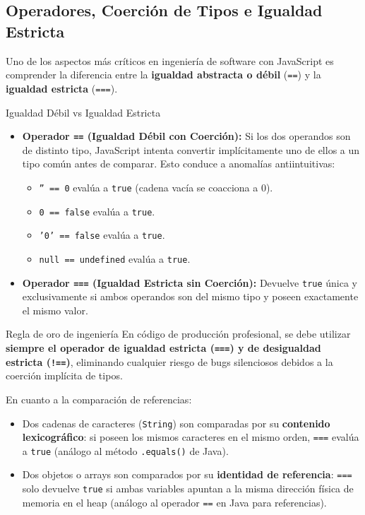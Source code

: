 \subsection{Operadores, Coerción de Tipos e Igualdad Estricta}

Uno de los aspectos más críticos en ingeniería de software con JavaScript es comprender la diferencia entre la \textbf{igualdad abstracta o débil} (\texttt{==}) y la \textbf{igualdad estricta} (\texttt{===}).

\begin{definicion}{Igualdad Débil vs Igualdad Estricta}
\begin{itemize}
    \item \textbf{Operador \texttt{==} (Igualdad Débil con Coerción):} Si los dos operandos son de distinto tipo, JavaScript intenta convertir implícitamente uno de ellos a un tipo común antes de comparar. Esto conduce a anomalías antiintuitivas:
    \begin{itemize}
        \item \texttt{'' == 0} evalúa a \texttt{true} (cadena vacía se coacciona a 0).
        \item \texttt{0 == false} evalúa a \texttt{true}.
        \item \texttt{'0' == false} evalúa a \texttt{true}.
        \item \texttt{null == undefined} evalúa a \texttt{true}.
    \end{itemize}
    \item \textbf{Operador \texttt{===} (Igualdad Estricta sin Coerción):} Devuelve \texttt{true} única y exclusivamente si ambos operandos son del mismo tipo y poseen exactamente el mismo valor.
\end{itemize}
\end{definicion}

\begin{importante}{Regla de oro de ingeniería}
En código de producción profesional, se debe utilizar \textbf{siempre el operador de igualdad estricta (\texttt{===}) y de desigualdad estricta (\texttt{!==})}, eliminando cualquier riesgo de bugs silenciosos debidos a la coerción implícita de tipos.
\end{importante}

En cuanto a la comparación de referencias:
\begin{itemize}
    \item Dos cadenas de caracteres (\texttt{String}) son comparadas por su \textbf{contenido lexicográfico}: si poseen los mismos caracteres en el mismo orden, \texttt{===} evalúa a \texttt{true} (análogo al método \texttt{.equals()} de Java).
    \item Dos objetos o arrays son comparados por su \textbf{identidad de referencia}: \texttt{===} solo devuelve \texttt{true} si ambas variables apuntan a la misma dirección física de memoria en el heap (análogo al operador \texttt{==} en Java para referencias).
\end{itemize}


